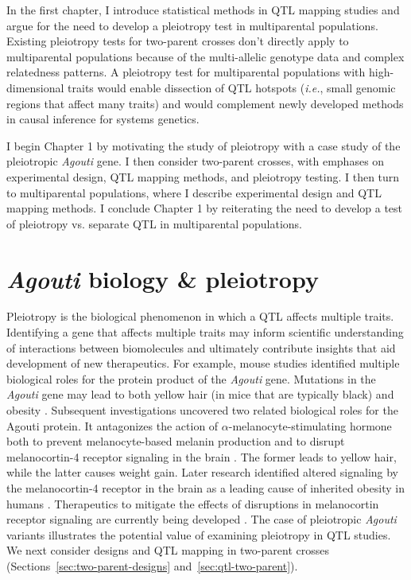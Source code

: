 \documentclass[oneside]{book}\usepackage[]{graphicx}\usepackage[]{color}
\begin{document}
In the first chapter, I introduce statistical methods in QTL 
mapping studies and argue for the need to develop a pleiotropy test
in multiparental populations. Existing pleiotropy tests for two-parent
crosses don't directly apply to multiparental populations because of the
multi-allelic genotype data and complex relatedness patterns.
A pleiotropy test for multiparental populations with high-dimensional
traits would enable dissection of QTL hotspots (\emph{i.e.}, small 
genomic regions that affect many traits) and would complement newly 
developed methods in causal inference for systems genetics.


I begin Chapter 1 by motivating the study of
pleiotropy with a case study of the pleiotropic \emph{Agouti} gene.
I then consider two-parent crosses, with emphases on experimental design,
QTL mapping methods, and pleiotropy testing. 
I then turn to multiparental populations, where I describe experimental
design and QTL mapping
methods. I conclude Chapter 1 by reiterating the need to develop a
test of pleiotropy vs. separate QTL in multiparental populations.




\section{\emph{Agouti} biology \& pleiotropy}
Pleiotropy is the biological phenomenon in which a QTL affects multiple traits. 
Identifying a gene that affects multiple traits may inform scientific understanding of
interactions between biomolecules and ultimately contribute insights that aid development
of new therapeutics. 
For example, mouse studies identified multiple biological roles for the protein product of 
the \emph{Agouti} gene. Mutations in the \emph{Agouti} gene may lead to both 
yellow hair (in mice that are typically black) and obesity \citep{attie2017how}.
Subsequent investigations uncovered two related biological roles for the Agouti protein.
It antagonizes the action of $\alpha$-melanocyte-stimulating hormone both to
prevent melanocyte-based melanin production and to disrupt melanocortin-4
receptor signaling in the brain \citep{lu1994agouti,klebig1995ectopic,huszar1997targeted}.
The former leads to yellow hair, while the latter causes weight gain.
Later research identified altered signaling by the melanocortin-4 receptor in
the brain as a leading cause of inherited obesity in humans \citep{farooqi2003clinical,vaisse2000melanocortin}.
Therapeutics to mitigate the effects of disruptions in melanocortin receptor signaling are
currently being developed \citep{macneil2002role,fani2014melanocortin}.
The case of pleiotropic \emph{Agouti} variants illustrates the potential value of examining pleiotropy in QTL studies.
We next consider designs and QTL mapping in two-parent crosses (Sections~\ref{sec:two-parent-designs} and~\ref{sec:qtl-two-parent}).
\end{document}
